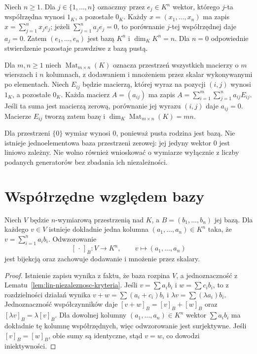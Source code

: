 \begin{przyklad}
\label{prz:lin-bazy-macierzy}
Niech \(n\geq1\). Dla \(j\in\{1,\ldots,n\}\)
oznaczmy przez \(e_j\in K^n\) wektor,
którego \(j\)-ta współrzędna wynosi \(1_K\),
a pozostałe \(0_K\). Każdy \(x=(x_1,\ldots,x_n)\)
ma zapis \(x=\sum_{j=1}^n x_je_j\);
jeżeli \(\sum_{j=1}^n a_je_j=0\),
to porównanie \(j\)-tej współrzędnej daje \(a_j=0\).
Zatem \((e_1,\ldots,e_n)\) jest bazą \(K^n\)
i \(\dim_K K^n=n\). Dla \(n=0\) odpowiednie
stwierdzenie pozostaje prawdziwe z bazą pustą.

Dla \(m,n\geq1\) niech
\(\operatorname{Mat}_{m\times n}(K)\) oznacza
przestrzeń wszystkich macierzy o \(m\) wierszach
i \(n\) kolumnach, z dodawaniem i mnożeniem
przez skalar wykonywanymi po elementach.
Niech \(E_{ij}\) będzie macierzą, której
wyraz na pozycji \((i,j)\) wynosi \(1_K\),
a pozostałe \(0_K\).
Każda macierz \(A=(a_{ij})\) ma zapis
\(A=\sum_{i=1}^m\sum_{j=1}^n a_{ij}E_{ij}\).
Jeśli ta suma jest macierzą zerową,
porównanie jej wyrazu \((i,j)\) daje \(a_{ij}=0\).
Macierze \(E_{ij}\) tworzą zatem bazę
i \(\dim_K\operatorname{Mat}_{m\times n}(K)=mn\).
\end{przyklad}

\begin{uwaga}
\label{rem:lin-dim-nie-baza}
Dla przestrzeni \(\{0\}\) wymiar wynosi \(0\),
ponieważ pusta rodzina jest bazą. Nie istnieje
jednoelementowa baza przestrzeni zerowej:
jej jedyny wektor \(0\) jest liniowo zależny.
Nie wolno również wnioskować o wymiarze
wyłącznie z liczby podanych generatorów
bez zbadania ich niezależności.
\end{uwaga}

\section{Współrzędne względem bazy}
\label{sec:lin-wspolrzedne}

\begin{twierdzenie}
\label{thm:lin-wspolrzedne}
Niech \(V\) będzie \(n\)-wymiarową przestrzenią
nad \(K\), a \(B=(b_1,\ldots,b_n)\) jej bazą.
Dla każdego \(v\in V\) istnieje dokładnie jedna
kolumna \((a_1,\ldots,a_n)\in K^n\) taka, że
\(v=\sum_{i=1}^n a_ib_i\).
Odwzorowanie
\[
 [\,\cdot\,]_B\colon V\longrightarrow K^n,\qquad
 v\longmapsto(a_1,\ldots,a_n)
\]
jest bijekcją oraz zachowuje dodawanie
i mnożenie przez skalary.
\end{twierdzenie}
\begin{proof}
Istnienie zapisu wynika z faktu, że baza rozpina \(V\),
a jednoznaczność z
Lematu~\ref{lem:lin-niezaleznosc-kryteria}.
Jeśli \(v=\sum a_ib_i\) i \(w=\sum c_ib_i\),
to z rozdzielności działań wynika
\(v+w=\sum(a_i+c_i)b_i\) i
\(\lambda v=\sum(\lambda a_i)b_i\).
Jednoznaczność współczynników daje
\([v+w]_B=[v]_B+[w]_B\) oraz
\([\lambda v]_B=\lambda[v]_B\).
Dla dowolnej kolumny \((a_1,\ldots,a_n)\in K^n\)
wektor \(\sum a_ib_i\) ma dokładnie tę kolumnę
współrzędnych, więc odwzorowanie jest surjektywne.
Jeśli \([v]_B=[w]_B\), obie sumy są identyczne,
stąd \(v=w\), co dowodzi iniektywności.
\end{proof}

